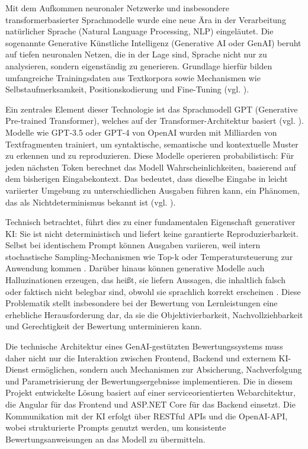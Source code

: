 \documentclass[a4paper,12pt]{article}
\begin{document}
Mit dem Aufkommen neuronaler Netzwerke und insbesondere transformerbasierter Sprachmodelle wurde eine neue Ära in der Verarbeitung natürlicher Sprache (Natural Language Processing, NLP) eingeläutet. Die sogenannte Generative Künstliche Intelligenz (Generative AI oder GenAI) beruht auf tiefen neuronalen Netzen, die in der Lage sind, Sprache nicht nur zu analysieren, sondern eigenständig zu generieren. Grundlage hierfür bilden umfangreiche Trainingsdaten aus Textkorpora sowie Mechanismen wie Selbstaufmerksamkeit, Positionskodierung und Fine-Tuning (vgl.  \textcite{radford}).

Ein zentrales Element dieser Technologie ist das Sprachmodell GPT (Generative Pre-trained Transformer), welches auf der Transformer-Architektur basiert (vgl. \textcite{vaswani2017attention}). Modelle wie GPT-3.5 oder GPT-4 von OpenAI wurden mit Milliarden von Textfragmenten trainiert, um syntaktische, semantische und kontextuelle Muster zu erkennen und zu reproduzieren. Diese Modelle operieren probabilistisch: Für jeden nächsten Token berechnet das Modell Wahrscheinlichkeiten, basierend auf dem bisherigen Eingabekontext. Das bedeutet, dass dieselbe Eingabe in leicht variierter Umgebung zu unterschiedlichen Ausgaben führen kann, ein Phänomen, das als Nichtdeterminismus bekannt ist (vgl. \textcite{openai_reasoning}).

Technisch betrachtet, führt dies zu einer fundamentalen Eigenschaft generativer KI: Sie ist nicht deterministisch und liefert keine garantierte Reproduzierbarkeit. Selbst bei identischem Prompt können Ausgaben variieren, weil intern stochastische Sampling-Mechanismen wie Top-k oder Temperatursteuerung zur Anwendung kommen \parencite{holtzman}. Darüber hinaus können generative Modelle auch Halluzinationen erzeugen, das heißt, sie liefern Aussagen, die inhaltlich falsch oder faktisch nicht belegbar sind, obwohl sie sprachlich korrekt erscheinen \parencite{openai_reasoning}. Diese Problematik stellt insbesondere bei der Bewertung von Lernleistungen eine erhebliche Herausforderung dar, da sie die Objektivierbarkeit, Nachvollziehbarkeit und Gerechtigkeit der Bewertung unterminieren kann.

Die technische Architektur eines GenAI-gestützten Bewertungssystems muss daher nicht nur die Interaktion zwischen Frontend, Backend und externem KI-Dienst ermöglichen, sondern auch Mechanismen zur Absicherung, Nachverfolgung und Parametrisierung der Bewertungsergebnisse implementieren. Die in diesem Projekt entwickelte Lösung basiert auf einer serviceorientierten Webarchitektur, die Angular für das Frontend und ASP.NET Core für das Backend einsetzt. Die Kommunikation mit der KI erfolgt über RESTful APIs und die OpenAI-API, wobei strukturierte Prompts genutzt werden, um konsistente Bewertungsanweisungen an das Modell zu übermitteln.
\end{document}
